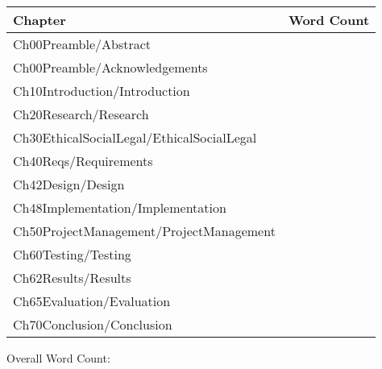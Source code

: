 \documentclass[]{article}
\numberwithin{equation}{section} %
\begin{document}
\newcommand{\chapterwordcount}[1]{#1 & \quickwordcount{#1} \\}

\begin{tabular}{lc}
    Chapter & Word Count \\
    \hline
    \chapterwordcount{Ch00Preamble/Abstract}
    \chapterwordcount{Ch00Preamble/Acknowledgements}
    \chapterwordcount{Ch10Introduction/Introduction}
    \chapterwordcount{Ch20Research/Research}
    \chapterwordcount{Ch30EthicalSocialLegal/EthicalSocialLegal}
    \chapterwordcount{Ch40Reqs/Requirements}
    \chapterwordcount{Ch42Design/Design}
    \chapterwordcount{Ch48Implementation/Implementation}
    \chapterwordcount{Ch50ProjectManagement/ProjectManagement}
    \chapterwordcount{Ch60Testing/Testing}
    \chapterwordcount{Ch62Results/Results}
    \chapterwordcount{Ch65Evaluation/Evaluation}
    \chapterwordcount{Ch70Conclusion/Conclusion}
\end{tabular}


\vspace{5em}
Overall Word Count: 
\end{document}
